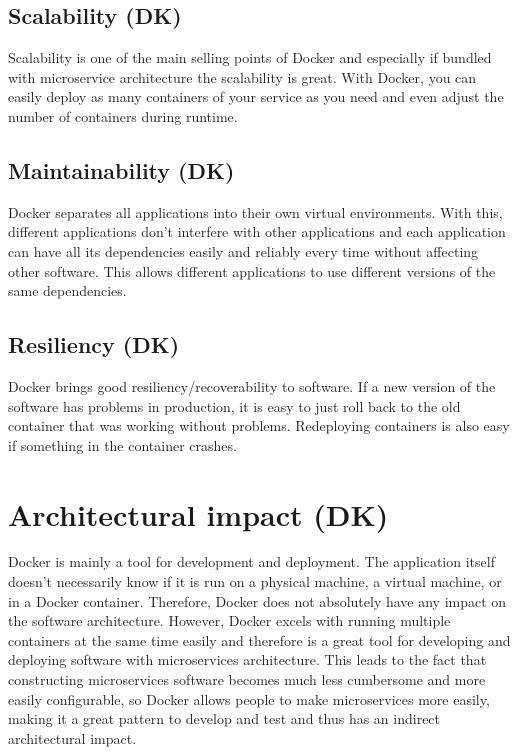 \documentclass[fleqn,12pt]{olplainarticle}
\begin{document}
\subsection{Scalability (DK)}
Scalability is one of the main selling points of Docker and especially if bundled with microservice architecture the scalability is great. With Docker, you can easily deploy as many containers of your service as you need and even adjust the number of containers during runtime.

\subsection{Maintainability (DK)}
Docker separates all applications into their own virtual environments. With this, different applications don't interfere with other applications and each application can have all its dependencies easily and reliably every time without affecting other software. This allows different applications to use different versions of the same dependencies.

\subsection{Resiliency (DK)}
Docker brings good resiliency/recoverability to software. If a new version of the software has problems in production, it is easy to just roll back to the old 
container that was working without problems. Redeploying containers is also easy if something in the container crashes.

\section{Architectural impact (DK)}


Docker is mainly a tool for development and deployment. The application itself doesn't necessarily know if it is run on a physical machine, a virtual machine, or in a Docker container. Therefore, Docker does not absolutely have any impact on the software architecture. However, Docker excels with running multiple containers at the same time easily and therefore is a great tool for developing and deploying software with microservices architecture. This leads to the fact
that constructing microservices software becomes much less cumbersome and more easily configurable, so Docker allows people to make microservices more easily, making it a great pattern to develop and test and thus has an indirect architectural impact.
\end{document}
